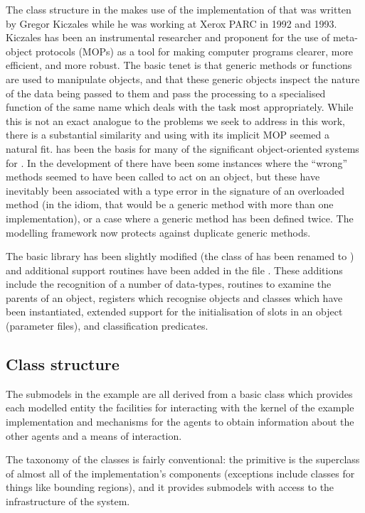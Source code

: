 The class structure in the \ReModel makes use of the \Scheme
implementation of \CLOS that was written by Gregor
Kiczales \citep{kiczales1993xerox} while he was working at Xerox PARC
in 1992 and 1993.  Kiczales has been an instrumental researcher and
proponent for the use of meta-object protocols (MOPs) as a tool for
making computer programs clearer, more efficient, and more robust.
The basic tenet is that generic methods or functions are used to
manipulate objects, and that these generic objects inspect the nature
of the data being passed to them and pass the processing to a
specialised function of the same name which deals with the task most
appropriately.  While this is not an exact analogue to the problems we
seek to address in this work, there is a substantial similarity and
using \SCLOS with its implicit MOP seemed a natural fit.  \SCLOS has
been the basis for many of the significant object-oriented systems for
\Scheme.  In the development of \ReModel there have been some
instances where the ``wrong'' methods seemed to have been
called to act on an object, but these have inevitably been associated
with a type error in the signature of an overloaded method (in
the \SCLOS idiom, that would be a generic method with more than one
implementation), or a case where a generic method has been defined
twice. The modelling framework now protects against duplicate generic
methods. 

The basic \SCLOS library has been slightly modified
(the  class of \SCLOS has been renamed
to ) and additional support routines have
been added in the file .  These additions
include the recognition of a number of \Scheme data-types, routines to
examine the parents of an object, registers which recognise objects
and classes which have been instantiated, extended support for the
initialisation of slots in an \SCLOS object (parameter files), and
classification predicates.  

\subsection{Class structure}
The submodels in the example are all derived from a basic
 class which provides each modelled entity the
facilities for interacting with the kernel of the example
implementation and mechanisms for the agents to obtain information
about the other agents and a means of interaction.

The taxonomy of the classes is fairly conventional: the primitive
\magent is the superclass of almost all of the implementation's components
(exceptions include classes for things like bounding regions), and it
provides submodels with access to the infrastructure of the system. 

